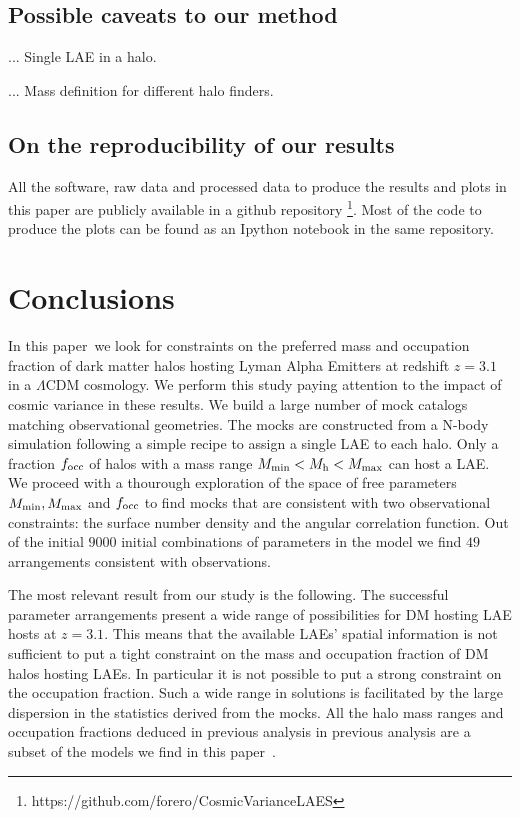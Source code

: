 \documentclass[usenatbib]{mn2e}
\newcommand{\documentname}{paper~}
\begin{document}
\subsection{Possible caveats to our method}

... Single LAE in a halo.

... Mass definition for different halo finders.

\subsection{On the reproducibility of our results}

All the software, raw data and processed data to produce the results
and plots in this paper are publicly available in a github
repository \footnote{https://github.com/forero/CosmicVarianceLAES}. Most
of the code to produce the plots can be found as an Ipython notebook
\citep{IPython} in the same repository.


\section{Conclusions}
\label{sec:conclusions}

In this \documentname we look for constraints on the preferred mass
and occupation fraction of dark matter halos hosting Lyman Alpha Emitters at
redshift $z=3.1$ in a $\Lambda$CDM cosmology. We perform this study
paying attention to the impact of cosmic variance in these results. We
build a large number of mock catalogs matching observational
geometries. The mocks are constructed from a N-body simulation
following a simple recipe to assign a single LAE to each halo. Only
a fraction $f_{\rm occ}$ of halos with a mass range  $M_{\rm
  min}<M_{\rm h}<M_{\rm   max}$ can host a LAE. We proceed with a
thourough exploration of the space of free parameters $M_{\rm min},
M_{\rm max}$ and $f_{\rm occ}$ to find mocks that are consistent with
two observational constraints: the surface number density and the
angular correlation function. Out of the initial $9000$ initial
combinations of parameters in the model we find $49$ arrangements
consistent with observations.


The most relevant result from our study is the following. The 
successful parameter arrangements present a wide range of possibilities for
DM hosting LAE hosts at $z=3.1$. This means that the available LAEs' spatial
information is not sufficient to put a tight constraint on the mass
and occupation fraction of DM halos hosting LAEs. In particular it is
not possible to put a strong constraint on the occupation
fraction. Such a wide range in solutions is facilitated by the large
dispersion in the statistics derived from the mocks. All the halo mass
ranges and occupation fractions deduced in previous analysis in
previous analysis \citep[i.e.][]{Gawiser2007} are a subset of the
models we find in this \documentname.  
 
\end{document}
